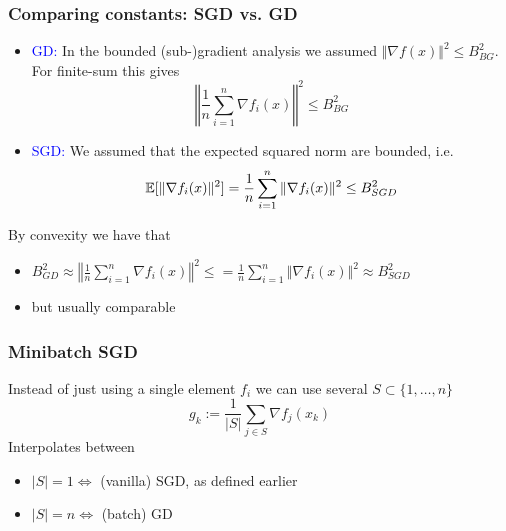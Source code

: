\documentclass{beamer}
\begin{document}
\begin{frame}
  \frametitle{Comparing constants: SGD vs. GD}
  \begin{itemize}
    \item \textcolor{blue}{GD:} In the bounded (sub-)gradient analysis we assumed $\Vert \nabla f(x) \Vert^2 \le B_{BG}^2$. For finite-sum this gives
          \begin{equation}
            \left\Vert \frac{1}{n}\sum_{i=1}^{n}\nabla f_i(x) \right\Vert^2 \le B_{BG}^2
          \end{equation}
    \item \textcolor{blue}{SGD:} We assumed that the expected squared norm are bounded, i.e.
          \begin{equation}
            \mathbb{E}[ \Vert \nabla f_i(x) \Vert^2 ] = \frac{1}{n} \sum_{i=1}^{n} \Vert \nabla f_i(x) \Vert^2 \le B_{SGD}^2
          \end{equation}
  \end{itemize}

  By convexity we have that
  \begin{itemize}
    \item $B_{GD}^2 \approx \left\Vert \frac{1}{n}\sum_{i=1}^{n}\nabla f_i(x) \right\Vert^2 \le = \frac{1}{n} \sum_{i=1}^{n} \Vert \nabla f_i(x) \Vert^2 \approx B_{SGD}^2$
    \item but usually comparable
  \end{itemize}
\end{frame}


\begin{frame}
  \frametitle{Minibatch SGD}
  Instead of just using a single element $f_i$ we can use several $S \subset \{1, \dots, n\}$
  \begin{equation}
    g_k := \frac{1}{\vert S \vert} \sum_{j\in S} \nabla f_j(x_k)
  \end{equation}
  Interpolates between
  \begin{itemize}
    \item $\vert S \vert=1 \Leftrightarrow $ (vanilla) SGD, as defined earlier
    \item $\vert S \vert= n \Leftrightarrow$ (batch) GD
  \end{itemize}

\end{frame}
\end{document}
